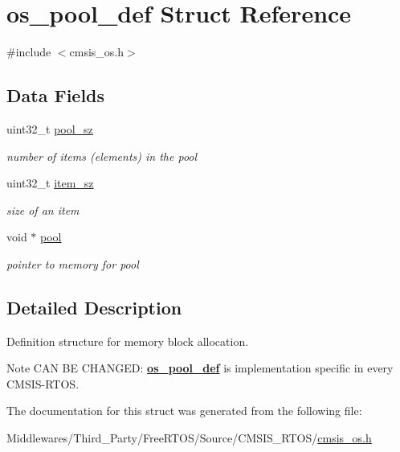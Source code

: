 \hypertarget{structos__pool__def}{}\section{os\+\_\+pool\+\_\+def Struct Reference}
\label{structos__pool__def}


{\ttfamily \#include $<$cmsis\+\_\+os.\+h$>$}

\subsection*{Data Fields}
\begin{DoxyCompactItemize}
\item 
\mbox{\label{structos__pool__def_ac112e786b2a234e0e45cb5bdbee53763}} 
uint32\+\_\+t \mbox{\hyperlink{structos__pool__def_ac112e786b2a234e0e45cb5bdbee53763}{pool\+\_\+sz}}
\begin{DoxyCompactList}\small\item\em number of items (elements) in the pool \end{DoxyCompactList}\item 
\mbox{\label{structos__pool__def_a4c2a0c691de3365c00ecd22d8102811f}} 
uint32\+\_\+t \mbox{\hyperlink{structos__pool__def_a4c2a0c691de3365c00ecd22d8102811f}{item\+\_\+sz}}
\begin{DoxyCompactList}\small\item\em size of an item \end{DoxyCompactList}\item 
\mbox{\label{structos__pool__def_a269c3935f8bc66db70bccdd02cb05e3c}} 
void $\ast$ \mbox{\hyperlink{structos__pool__def_a269c3935f8bc66db70bccdd02cb05e3c}{pool}}
\begin{DoxyCompactList}\small\item\em pointer to memory for pool \end{DoxyCompactList}\end{DoxyCompactItemize}


\subsection{Detailed Description}
Definition structure for memory block allocation. \begin{DoxyNote}{Note}
C\+AN BE C\+H\+A\+N\+G\+ED\+: {\bfseries \mbox{\hyperlink{structos__pool__def}{os\+\_\+pool\+\_\+def}}} is implementation specific in every C\+M\+S\+I\+S-\/\+R\+T\+OS. 
\end{DoxyNote}


The documentation for this struct was generated from the following file\+:\begin{DoxyCompactItemize}
\item 
Middlewares/\+Third\+\_\+\+Party/\+Free\+R\+T\+O\+S/\+Source/\+C\+M\+S\+I\+S\+\_\+\+R\+T\+O\+S/\mbox{\hyperlink{cmsis__os_8h}{cmsis\+\_\+os.\+h}}\end{DoxyCompactItemize}
